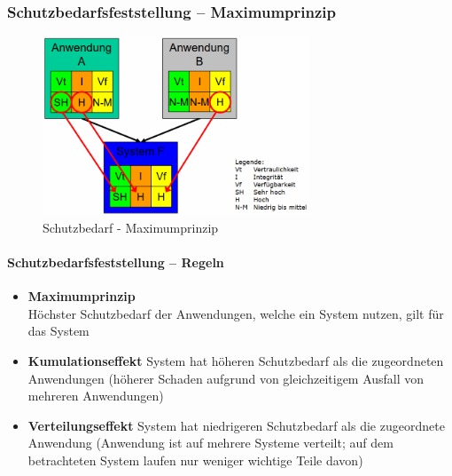 \documentclass[10pt,a4paper]{article}
\begin{document}
\subsubsection*{Schutzbedarfsfeststellung – Maximumprinzip}
\begin{figure}[H]
    \begin{center}
    \includegraphics[width=8cm]{images/Schutzbedarf - Maximumprinzip.png}
    \caption{Schutzbedarf - Maximumprinzip}
    \label{Schutzbedarf - Maximumprinzip}
    \end{center}
\end{figure}

\paragraph*{Schutzbedarfsfeststellung – Regeln}
\begin{itemize}[noitemsep,topsep=0pt,leftmargin=*]
    \item \textbf{Maximumprinzip}\\
    Höchster Schutzbedarf der Anwendungen, welche ein
    System nutzen, gilt für das System
    \item \textbf{Kumulationseffekt}
    System hat höheren Schutzbedarf als die zugeordneten
    Anwendungen (höherer Schaden aufgrund von
    gleichzeitigem Ausfall von mehreren Anwendungen)
    \item \textbf{Verteilungseffekt}
    System hat niedrigeren Schutzbedarf als die zugeordnete
    Anwendung (Anwendung ist auf mehrere Systeme verteilt;
    auf dem betrachteten System laufen nur weniger wichtige
    Teile davon)
\end{itemize}
\end{document}
